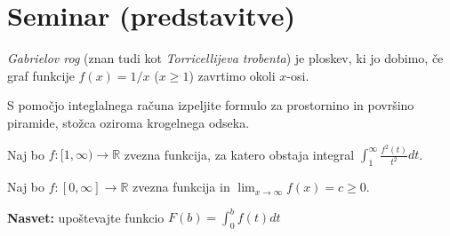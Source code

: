 \documentclass[11pt,a4paper]{exam}
\renewcommand{\geq}{\geqslant}
\renewcommand{\{}{\lbrace}
\renewcommand{\}}{\rbrace}
\begin{document}
\section*{Seminar (predstavitve)}
	\begin{questions}
		\question \emph{Gabrielov rog} (znan tudi kot \emph{Torricellijeva trobenta}) je ploskev, ki jo dobimo, če graf funkcije $f(x) = 1/x$ ($x \geq 1$) zavrtimo okoli $x$-osi. 

		\question S pomočjo integlalnega računa izpeljite formulo za prostornino in površino piramide, stožca oziroma krogelnega odseka.

		\question Naj bo $f: [1, \infty) \to \mathbb{R}$ zvezna funkcija, za katero obstaja integral $ \displaystyle \int_{1}^{\infty} \frac{f^{2}(t)}{t^{2}} dt$.

		\question Naj bo $f: [0, \infty] \to \mathbb{R}$ zvezna funkcija in $\displaystyle \lim_{x \to \infty} f(x) = c \geq 0$.
		\textbf{Nasvet:} upoštevajte funkcio $F(b)= \displaystyle \int_{0}^{b} f(t) dt$
	\end{questions}
	\pagestyle{empty}
\clearpage
\end{document}
